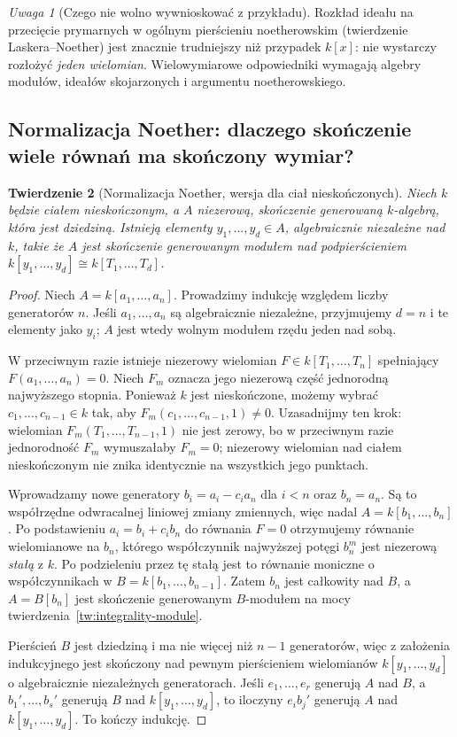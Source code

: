 \documentclass[11pt,a4paper,openany]{report}
\numberwithin{equation}{section}
\theoremstyle{plain}
\newtheorem{twierdzenie}{Twierdzenie}[section]
\theoremstyle{definition}
\theoremstyle{remark}
\newtheorem{uwaga}[twierdzenie]{Uwaga}
\begin{document}
\begin{uwaga}[Czego nie wolno wywnioskować z przykładu]
Rozkład ideału na przecięcie prymarnych w ogólnym
pierścieniu noetherowskim (twierdzenie Laskera--Noether)
jest znacznie trudniejszy niż przypadek $k[x]$:
nie wystarczy rozłożyć \emph{jeden wielomian}.
Wielowymiarowe odpowiedniki wymagają
algebry modułów, ideałów skojarzonych i argumentu
noetherowskiego.
\end{uwaga}

\subsection{Normalizacja Noether: dlaczego skończenie wiele równań ma skończony wymiar?}
\begin{twierdzenie}[Normalizacja Noether, wersja dla ciał nieskończonych]
\label{tw:noether-norm}
Niech $k$ będzie ciałem nieskończonym, a $A$
niezerową, skończenie generowaną $k$-algebrą,
która jest dziedziną. Istnieją elementy
$y_1,\ldots,y_d\in A$, algebraicznie niezależne
nad $k$, takie że $A$ jest skończenie generowanym
modułem nad podpierścieniem
$k[y_1,\ldots,y_d]\cong k[T_1,\ldots,T_d]$.
\end{twierdzenie}
\begin{proof}
Niech $A=k[a_1,\ldots,a_n]$. Prowadzimy indukcję
względem liczby generatorów $n$. Jeśli
$a_1,\ldots,a_n$ są algebraicznie niezależne,
przyjmujemy $d=n$ i te elementy jako $y_i$;
$A$ jest wtedy wolnym modułem rzędu jeden nad sobą.

W przeciwnym razie istnieje niezerowy wielomian
$F\in k[T_1,\ldots,T_n]$ spełniający
$F(a_1,\ldots,a_n)=0$. Niech $F_m$ oznacza
jego niezerową część jednorodną najwyższego stopnia.
Ponieważ $k$ jest nieskończone, możemy wybrać
$c_1,\ldots,c_{n-1}\in k$ tak, aby
$F_m(c_1,\ldots,c_{n-1},1)\ne0$.
Uzasadnijmy ten krok: wielomian
$F_m(T_1,\ldots,T_{n-1},1)$ nie jest zerowy,
bo w przeciwnym razie jednorodność $F_m$
wymuszałaby $F_m=0$; niezerowy wielomian
nad ciałem nieskończonym nie znika identycznie
na wszystkich jego punktach.

Wprowadzamy nowe generatory
$b_i=a_i-c_i a_n$ dla $i<n$ oraz $b_n=a_n$.
Są to współrzędne odwracalnej liniowej zmiany
zmiennych, więc nadal $A=k[b_1,\ldots,b_n]$.
Po podstawieniu $a_i=b_i+c_i b_n$ do równania
$F=0$ otrzymujemy równanie wielomianowe
na $b_n$, którego współczynnik najwyższej potęgi
$b_n^m$ jest niezerową \emph{stałą} z $k$.
Po podzieleniu przez tę stałą jest to równanie
moniczne o współczynnikach w
$B=k[b_1,\ldots,b_{n-1}]$. Zatem $b_n$
jest całkowity nad $B$, a $A=B[b_n]$ jest
skończenie generowanym $B$-modułem na mocy
twierdzenia~\ref{tw:integrality-module}.

Pierścień $B$ jest dziedziną i ma nie więcej
niż $n-1$ generatorów, więc z założenia indukcyjnego
jest skończony nad pewnym pierścieniem wielomianów
$k[y_1,\ldots,y_d]$ o algebraicznie niezależnych
generatorach. Jeśli $e_1,\ldots,e_r$ generują
$A$ nad $B$, a $b_1',\ldots,b_s'$ generują $B$
nad $k[y_1,\ldots,y_d]$, to iloczyny $e_i b_j'$
generują $A$ nad $k[y_1,\ldots,y_d]$.
To kończy indukcję.
\end{proof}
\end{document}

